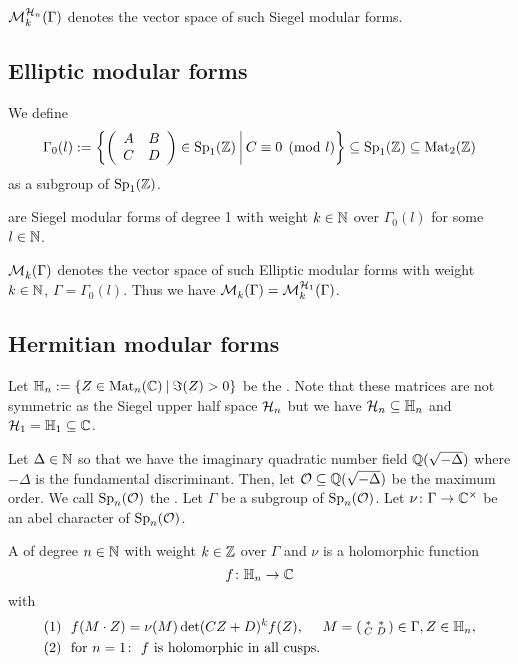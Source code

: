 $\operatorname{\mathcal{M}}^{\mathcal{H}_{n}}_k (\Gamma)$ denotes the vector space of such Siegel modular forms.

\subsection{Elliptic modular forms}

We define
\[ \Gamma_0(l) := \Set{\SimpleMatrix{A}{B}{C}{D} \in \Sp_1(\Z)}{C \equiv 0 \pmod{l}} \subseteq \Sp_1(\Z) \subseteq \M_2(\Z) \]
as a subgroup of $\operatorname{Sp}_1(\mathbb{Z})$.

 are Siegel modular forms of degree 1 with weight $k \in \mathbb{N}$ over $\Gamma_0(l)$ for some $l \in \mathbb{N}$.

$\operatorname{\mathcal{M}}^{}_k (\Gamma)$ denotes the vector space of such Elliptic modular forms with weight $k \in \mathbb{N}$, $\Gamma = \Gamma_0(l)$. Thus we have $\operatorname{\mathcal{M}}^{}_k (\Gamma) = \operatorname{\mathcal{M}}^{\mathcal{H}_{1}}_k (\Gamma)$.

\subsection{Hermitian modular forms}

Let $\HalfPlane_n :=  \Set{ Z \in \M_n(\C) }{ \Im(Z) > 0}$ be the . Note that these matrices are not symmetric as the Siegel upper half space $\mathcal{H}_n$ but we have $\mathcal{H}_n \subseteq \mathbb{H}_n$ and $\mathcal{H}_1 = \mathbb{H}_1 \subseteq \mathbb{C}$.


Let $\Delta \in \mathbb{N}$ so that we have the imaginary quadratic number field $\mathbb{Q}(\sqrt{-\Delta})$ where $-\Delta$ is the fundamental discriminant.
Then, let $\mathcal{O} \subseteq \mathbb{Q}(\sqrt{-\Delta})$ be the maximum order.
We call $\operatorname{Sp}_n(\mathcal{O})$ the .
Let $\Gamma$ be a subgroup of $\operatorname{Sp}_n(\mathcal{O})$.
Let $\nu \colon \Gamma \rightarrow \mathbb{C}^\times$ be an abel character of $\operatorname{Sp}_n(\mathcal{O})$.

A 
of degree $n\in\mathbb{N}$
with weight $k\in \mathbb{Z}$
over $\Gamma$ and $\nu$
is a holomorphic function
\[ f \colon \mathbb{H}_n \rightarrow \mathbb{C} \]
with
\begin{align*}
(1) \ \ & f(M \cdot Z) = \nu(M) \det(CZ + D)^k f(Z), \ \ \ \ M = \left( \begin{smallmatrix} * & * \\ C & D \end{smallmatrix} \right) \in \Gamma, Z \in \mathbb{H}_n , \\
(2) \ \ & \text{for } n = 1 \colon \ \text{$f$ is holomorphic in all cusps} .
\end{align*}

